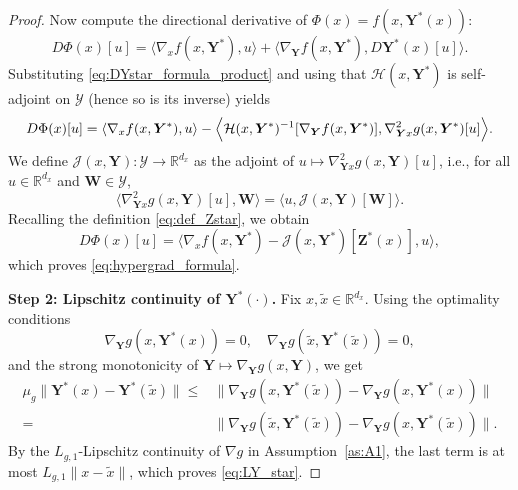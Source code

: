 \documentclass[10pt,a4paper]{amsart}
\newcommand{\Phiobj}{\Phi}
\newcommand{\R}{\mathbb{R}}
\begin{document}
\begin{proof}
Now compute the directional derivative of $\Phiobj(x)=f(x,\boldsymbol Y^*(x))$:
\begin{equation*}
D\Phiobj(x)[u] =\langle \nabla_x f(x,\boldsymbol Y^*),u\rangle +\langle \nabla_{\boldsymbol Y}f(x,\boldsymbol Y^*),D\boldsymbol Y^*(x)[u]\rangle.
\end{equation*}
Substituting \eqref{eq:DYstar_formula_product} and using that $\mathcal H(x,\boldsymbol Y^*)$ is self-adjoint on $\mathcal Y$ (hence so is its inverse) yields
\begin{equation*}
D\Phiobj(x)[u]
={}\langle \nabla_x f(x,\boldsymbol Y^*),u\rangle -\Bigl\langle
\mathcal H(x,\boldsymbol Y^*)^{-1}[\nabla_{\boldsymbol Y}f(x,\boldsymbol Y^*)],
\nabla_{\boldsymbol Y x}^2 g(x,\boldsymbol Y^*)[u]
\Bigr\rangle.
\end{equation*}
We define $\mathcal J(x,\boldsymbol Y):\mathcal Y\to\R^{d_x}$ as the adjoint of $u\mapsto \nabla_{\boldsymbol Y x}^2 g(x,\boldsymbol Y)[u]$, i.e., for all $u\in\R^{d_x}$ and $\boldsymbol W\in\mathcal Y$,
\begin{equation}\label{eq:adjoint_J_product}
\langle \nabla_{\boldsymbol Y x}^2 g(x,\boldsymbol Y)[u],\boldsymbol W\rangle
=\langle u,\mathcal J(x,\boldsymbol Y)[\boldsymbol W]\rangle.
\end{equation}
Recalling the definition \eqref{eq:def_Zstar}, we obtain
\begin{equation*}
D\Phiobj(x)[u] =\langle \nabla_x f(x,\boldsymbol Y^*)-\mathcal J(x,\boldsymbol Y^*)[\boldsymbol Z^*(x)],u\rangle,
\end{equation*}
which proves \eqref{eq:hypergrad_formula}.

\textbf{Step 2: Lipschitz continuity of $\boldsymbol Y^*(\cdot)$. }
Fix $x,\tilde x\in\R^{d_x}$. Using the optimality conditions
\begin{equation*}
\nabla_{\boldsymbol Y}g(x,\boldsymbol Y^*(x))=0, \quad \nabla_{\boldsymbol Y}g(\tilde x,\boldsymbol Y^*(\tilde x))=0,
\end{equation*}
and the strong monotonicity of $\boldsymbol Y\mapsto \nabla_{\boldsymbol Y}g(x,\boldsymbol Y)$, we get
\begin{equation*}
\begin{aligned}
\mu_g\|\boldsymbol Y^*(x)-\boldsymbol Y^*(\tilde x)\|
\le{}& \|\nabla_{\boldsymbol Y}g(x,\boldsymbol Y^*(\tilde x))-\nabla_{\boldsymbol Y}g(x,\boldsymbol Y^*(x))\| \\
={}& \|\nabla_{\boldsymbol Y}g(\tilde x,\boldsymbol Y^*(\tilde x))-\nabla_{\boldsymbol Y}g(x,\boldsymbol Y^*(\tilde x))\|.
\end{aligned}
\end{equation*}
By the $L_{g,1}$-Lipschitz continuity of $\nabla g$ in Assumption~\ref{as:A1}, the last term is at most $L_{g,1}\|x-\tilde x\|$, which proves \eqref{eq:LY_star}.


\end{proof}
\end{document}
